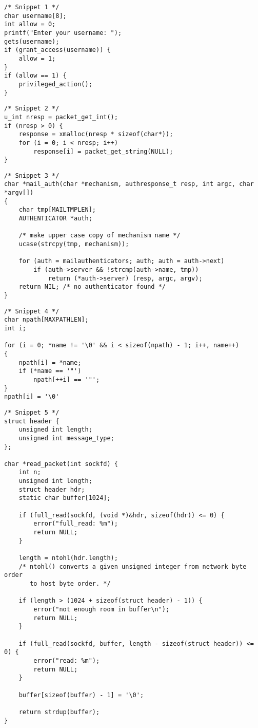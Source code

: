 \documentclass[12pt,a4paper]{article}
\begin{document}
\begin{lstlisting}
/* Snippet 1 */
char username[8];
int allow = 0;
printf("Enter your username: ");
gets(username);
if (grant_access(username)) {
    allow = 1;
}
if (allow == 1) {
    privileged_action();
}
\end{lstlisting}

\begin{lstlisting}
/* Snippet 2 */
u_int nresp = packet_get_int();
if (nresp > 0) {
	response = xmalloc(nresp * sizeof(char*));
	for (i = 0; i < nresp; i++)
		response[i] = packet_get_string(NULL);
}
\end{lstlisting}

\newpage

\begin{lstlisting}
/* Snippet 3 */
char *mail_auth(char *mechanism, authresponse_t resp, int argc, char *argv[])
{
	char tmp[MAILTMPLEN];
	AUTHENTICATOR *auth;
	
	/* make upper case copy of mechanism name */
	ucase(strcpy(tmp, mechanism));

	for (auth = mailauthenticators; auth; auth = auth->next)
		if (auth->server && !strcmp(auth->name, tmp))
			return (*auth->server) (resp, argc, argv);
	return NIL; /* no authenticator found */
}
\end{lstlisting}

\begin{lstlisting}
/* Snippet 4 */
char npath[MAXPATHLEN];
int i;

for (i = 0; *name != '\0' && i < sizeof(npath) - 1; i++, name++)
{
	npath[i] = *name;
	if (*name == '"')
		npath[++i] == '"';
}
npath[i] = '\0'
\end{lstlisting}

\newpage

\begin{lstlisting}
/* Snippet 5 */
struct header {
	unsigned int length;
	unsigned int message_type;
};

char *read_packet(int sockfd) {
	int n;
	unsigned int length;
	struct header hdr;
	static char buffer[1024];

	if (full_read(sockfd, (void *)&hdr, sizeof(hdr)) <= 0) {
		error("full_read: %m");
		return NULL;
	}
	
	length = ntohl(hdr.length);
	/* ntohl() converts a given unsigned integer from network byte order
	   to host byte order. */

	if (length > (1024 + sizeof(struct header) - 1)) {
		error("not enough room in buffer\n");
		return NULL;
	}
	
	if (full_read(sockfd, buffer, length - sizeof(struct header)) <= 0) {
		error("read: %m");
		return NULL;
	}

	buffer[sizeof(buffer) - 1] = '\0';

	return strdup(buffer);
}
\end{lstlisting}
\end{document}
